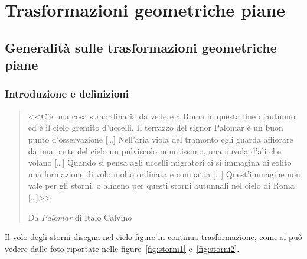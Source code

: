 
\chapter{Trasformazioni geometriche piane}\label{chap:trasformazioni}
% 


\section{Generalità sulle trasformazioni geometriche 
piane}\label{sect:generalita_trasformazioni}

\subsection{Introduzione e definizioni}

\begin{quote}
<<C'è una cosa straordinaria da vedere a Roma in questa fine 
d'autunno ed è il cielo gremito d'uccelli. Il terrazzo del signor 
Palomar è un buon punto d'osservazione [\ldots{}] Nell'aria viola del 
tramonto egli guarda affiorare da una parte del cielo un pulviscolo 
minutissimo, una nuvola d'ali che volano [\ldots{}] Quando si pensa 
agli uccelli migratori ci si immagina di solito una formazione di volo 
molto ordinata e compatta [\ldots{}] Quest'immagine non vale per gli 
storni, o almeno per questi storni autunnali nel cielo di Roma 
[\ldots{}]>>

\hfill{}Da \emph{Palomar} di Italo Calvino
\end{quote}

Il volo degli storni disegna nel cielo figure in continua 
trasformazione, come si può vedere dalle foto riportate nelle 
figure~\ref{fig:storni1} e~\ref{fig:storni2}.

